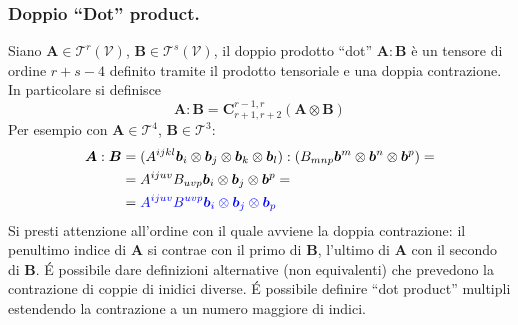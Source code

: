  \subsubsection{Doppio ``Dot'' product.}
 Siano $\bm{A} \in \mathcal{T}^r(\mathcal{V})$, $\bm{B} \in \mathcal{T}^s(\mathcal{V})$, il doppio prodotto ``dot'' $\bm{A} : \bm{B}$ è un tensore di ordine $r+s-4$ definito tramite il prodotto tensoriale e una doppia contrazione.
  In particolare si definisce
 \begin{equation}
  \bm{A} : \bm{B} = \bm{C}^{r-1,r}_{r+1,r+2} (\bm{A} \otimes \bm{B})
 \end{equation}
 Per esempio con $\bm{A} \in \mathcal{T}^4$, $\bm{B} \in \mathcal{T}^3$:
 \begin{equation}
 \begin{aligned}
  \bm{A} : \bm{B} & = (A^{ijkl} \bm{b}_i \otimes \bm{b}_j \otimes \bm{b}_k\otimes \bm{b}_l)
                             : (B_{mnp} \bm{b}^m \otimes \bm{b}^n \otimes \bm{b}^p) = \\
   & = A^{ijuv} B_{uvp} \bm{b}_i \otimes \bm{b}_j  \otimes \bm{b}^p = \\
   & ={\color{blue} A^{ijuv} B^{uvp} \bm{b}_i \otimes \bm{b}_j  \otimes \bm{b}_p}
 \end{aligned}
 \end{equation}
 Si presti attenzione all'ordine con il quale avviene la doppia contrazione: il penultimo indice di $\bm{A}$ si contrae con il primo di $\bm{B}$, l'ultimo di $\bm{A}$ con il secondo di $\bm{B}$. \'E possibile dare definizioni alternative (non equivalenti) che prevedono la contrazione di coppie di inidici diverse. \'E possibile definire ``dot product'' multipli estendendo la contrazione a un numero maggiore di indici.



